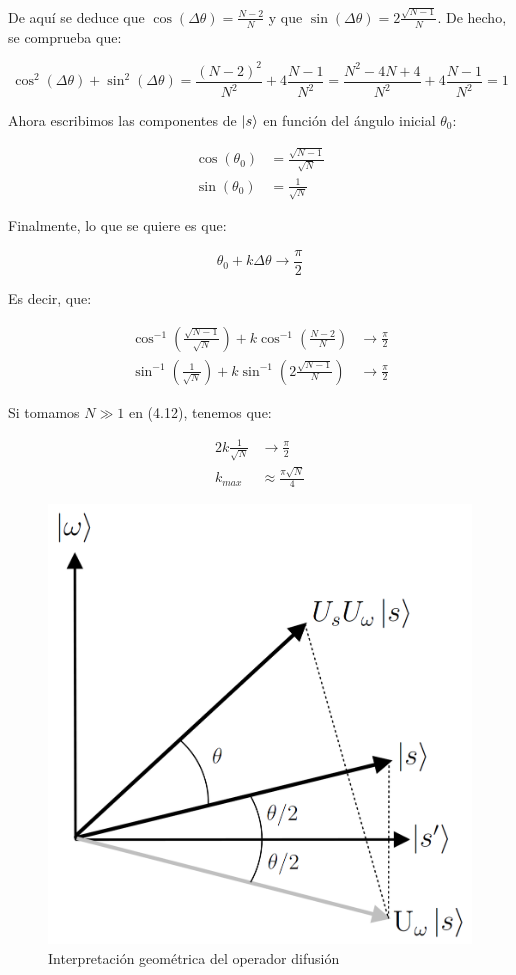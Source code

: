 De aquí se deduce que $\cos(\Delta\theta) = \frac{N-2}{N}$ y que $\sin(\Delta\theta) = 2\frac{\sqrt{N-1}}{N}$. De hecho, se comprueba que:

\begin{equation}
    \cos^2(\Delta\theta)+\sin^2(\Delta\theta)
    = \frac{(N-2)^2}{N^2} + 4\frac{N-1}{N^2}
    = \frac{N^2-4N+4}{N^2} + 4\frac{N-1}{N^2}
    = 1
\end{equation}

Ahora escribimos las componentes de $\ket{s}$ en función del ángulo inicial $\theta_0$:

\begin{align}
    \cos(\theta_0) &= \frac{\sqrt{N-1}}{\sqrt{N}} \\
    \sin(\theta_0) &= \frac{1}{\sqrt{N}}
    \label{eq:sinTheta0}
\end{align}

Finalmente, lo que se quiere es que:

\begin{equation}
    \theta_0 + k \Delta\theta \to \frac{\pi}{2}
\end{equation}

Es decir, que:

\begin{align}
    \cos^{-1}(\frac{\sqrt{N-1}}{\sqrt{N}}) + k\cos^{-1}(\frac{N-2}{N}) &\to \frac{\pi}{2} \\
    \sin^{-1}(\frac{1}{\sqrt{N}}) + k\sin^{-1}(2\frac{\sqrt{N-1}}{N}) &\to \frac{\pi}{2}
\end{align}

Si tomamos $N \gg 1$ en (4.12), tenemos que:

\begin{align}
    2k \frac{1}{\sqrt{N}} &\to \frac{\pi}{2} \\
    k_{max} &\approx \frac{\pi \sqrt{N}}{4}
\end{align}

\begin{figure}[H]
\centering \includegraphics[width=0.3\linewidth]{img/grover_geometry.png}
\caption{Interpretación geométrica del operador difusión}
\end{figure}

